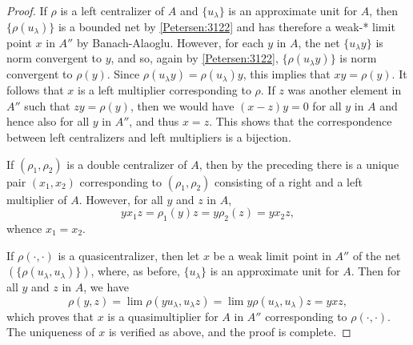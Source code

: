 \documentclass{book}
\begin{document}
\begin{proof}
  If \(\rho\) is a left centralizer of \(A\) and \(\{u_\lambda\}\) is an approximate unit for \(A\),
  then \(\{\rho(u_\lambda)\}\) is a bounded net by \ref{Petersen:3122} and has therefore a weak-* limit point \(x\) in \(A''\) by Banach-Alaoglu.
  However, for each \(y\) in \(A\), the net \(\{u_\lambda y\}\) is norm convergent to \(y\), and so, again by \ref{Petersen:3122},
  \(\{\rho(u_\lambda y)\}\) is norm convergent to \(\rho(y)\). Since \(\rho(u_\lambda y)=\rho(u_\lambda)y\),
  this implies that \(xy=\rho(y)\). It follows that \(x\) is a left multiplier corresponding to \(\rho\).
  If \(z\) was another element in \(A''\) such that \(zy=\rho(y)\), then we would have \((x-z)y=0\)
  for all \(y\) in \(A\) and hence also for all \(y\) in \(A''\), and thus \(x=z\).
  This shows that the correspondence between left centralizers and left multipliers is a bijection.\par
  If \((\rho_1,\rho_2)\) is a double centralizer of \(A\), then by the preceding there is a unique pair \((x_1,x_2)\) corresponding to
  \((\rho_1,\rho_2)\) consisting of a right and a left multiplier of \(A\). However, for all \(y\) and \(z\) in \(A\),
  \[
    yx_1 z=\rho_1(y)z=y\rho_2(z)=yx_2 z,
  \]
  whence \(x_1=x_2\).\par
  If \(\rho(\cdot,\cdot)\) is a quasicentralizer, then let \(x\) be a weak limit point in \(A''\) of the
  net \((\{\rho(u_\lambda,u_\lambda)\})\), where, as before, \(\{u_\lambda\}\) is an approximate unit for \(A\). Then for
  all \(y\) and \(z\) in \(A\), we have
  \[
    \rho(y,z)=\lim\rho(yu_\lambda,u_\lambda z)=\lim y\rho(u_\lambda,u_\lambda)z=yxz,
  \]
  which proves that \(x\) is a quasimultiplier for \(A\) in \(A''\) corresponding to \(\rho(\cdot,\cdot)\).
  The uniqueness of \(x\) is verified as above, and the proof is complete.
\end{proof}
\end{document}
